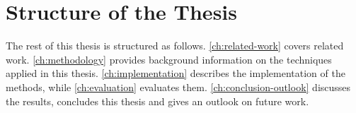 
\section{Structure of the Thesis}\label{sec:structure-of-the-thesis}
The rest of this thesis is structured as follows.
\autoref{ch:related-work} covers related work.
\autoref{ch:methodology} provides background information on the techniques applied in this thesis.
\autoref{ch:implementation} describes the implementation of the methods, while
\autoref{ch:evaluation} evaluates them.
\autoref{ch:conclusion-outlook} discusses the results, concludes this thesis and gives an outlook on future work.